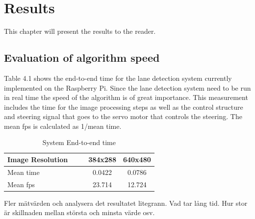 \chapter{Results}
\label{sec:results}

This chapter will present the results to the reader.


\section{Evaluation of algorithm speed}
Table 4.1 shows the end-to-end time for the lane detection system currently implemented on the Raspberry Pi. Since the lane detection system need to be run in real time the speed of the algorithm is of great importance. This measurement includes the time for the image processing steps as well as the control structure and steering signal that goes to the servo motor that controls the steering. The mean fps is calculated as 1/mean time.


\begin{table}[H]
\centering
\caption{System End-to-end time}
\label{End-to-end time}
\begin{tabular}{@{} l *4c @{}}
\toprule
Image Resolution   & & & 384x288 & 640x480  \\ 
\midrule
 Mean time & & & 0.0422 & 0.0786 \\ 
 Mean fps & & & 23.714 & 12.724 \\
\bottomrule
 \end{tabular}
\end{table}


Fler mätvärden och analysera det resultatet litegrann. Vad tar lång tid. Hur stor är skillnaden mellan största och minsta värde osv.\\



